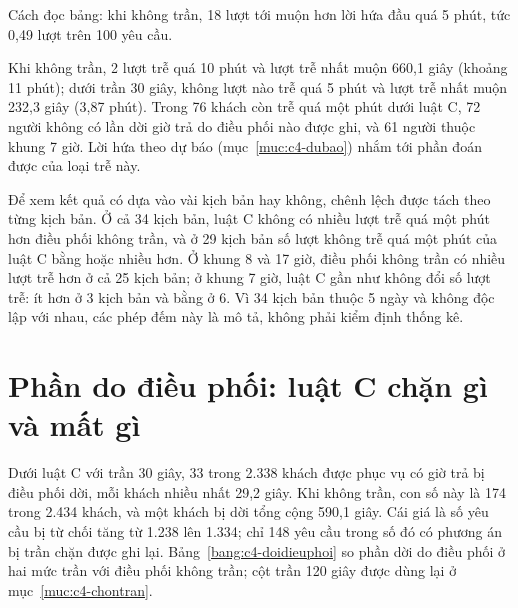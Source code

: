 Cách đọc bảng: khi không trần, 18 lượt tới muộn hơn lời hứa đầu quá 5 phút, tức 0,49 lượt trên 100 yêu
cầu.

Khi không trần, 2 lượt trễ quá 10 phút và lượt trễ nhất muộn 660,1 giây (khoảng 11 phút); dưới trần 30 giây, không
lượt nào trễ quá 5 phút và lượt trễ nhất muộn 232,3 giây (3,87 phút). Trong 76 khách còn trễ quá một phút dưới luật
C, 72 người không có lần dời giờ trả do điều phối nào được ghi, và 61 người thuộc khung 7 giờ. Lời hứa theo dự báo
(mục~\ref{muc:c4-dubao}) nhắm tới phần đoán được của loại trễ này.

Để xem kết quả có dựa vào vài kịch bản hay không, chênh lệch được tách theo từng kịch bản. Ở cả 34 kịch bản, luật
C không có nhiều lượt trễ quá một phút hơn điều phối không trần, và ở 29 kịch bản số lượt không trễ quá một phút của
luật C bằng hoặc nhiều hơn. Ở khung 8 và 17 giờ, điều phối không trần có nhiều lượt trễ hơn ở cả 25 kịch bản; ở khung
7 giờ, luật C gần như không đổi số lượt trễ: ít hơn ở 3 kịch bản và bằng ở 6. Vì 34 kịch bản thuộc 5 ngày và không
độc lập với nhau, các phép đếm này là mô tả, không phải kiểm định thống kê.

\section{Phần do điều phối: luật C chặn gì và mất gì}
\label{muc:c4-dieuphoi}

Dưới luật C với trần 30 giây, 33 trong 2.338 khách được phục vụ có giờ trả bị điều phối dời, mỗi khách nhiều nhất
29,2 giây. Khi không trần, con số này là 174 trong 2.434 khách, và một khách bị dời tổng cộng 590,1 giây. Cái giá là
số yêu cầu bị từ chối tăng từ 1.238 lên 1.334; chỉ 148 yêu cầu trong số đó có phương án bị trần chặn được ghi lại.
Bảng~\ref{bang:c4-doidieuphoi} so phần dời do điều phối ở hai mức trần với điều phối không trần; cột trần 120 giây
được dùng lại ở mục~\ref{muc:c4-chontran}.

